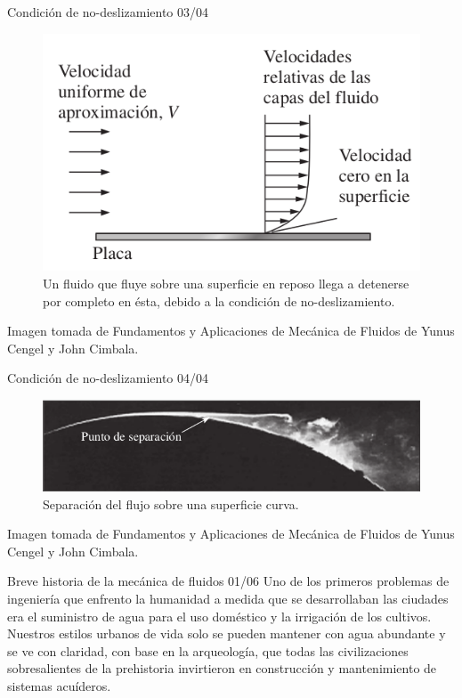 \begin{frame}{Condición de no-deslizamiento 03/04}
\justifying
\begin{figure}[H]
\centering
\includegraphics[scale=0.2]{Section_Files/imagenes/sec01_0101_Fig01-10.png}
\caption{Un fluido que fluye sobre una superficie en reposo llega a detenerse por completo en ésta, debido a la condición de no-deslizamiento.}
\label{fig: Figura1-10}
\end{figure}
Imagen tomada de Fundamentos y Aplicaciones de Mecánica de Fluidos de Yunus Cengel y John Cimbala.
\end{frame}
	
\begin{frame}{Condición de no-deslizamiento 04/04}
\justifying
\begin{figure}[H]
\centering
\includegraphics[scale=0.2]{Section_Files/imagenes/sec01_0101_Fig01-11.png}
\caption{Separación del flujo sobre una superficie curva.}
\label{fig: Figura1-11}
\end{figure}
Imagen tomada de Fundamentos y Aplicaciones de Mecánica de Fluidos de Yunus Cengel y John Cimbala.
\end{frame}




\begin{frame}{Breve historia de la mecánica de fluidos 01/06}
\justifying
Uno de los primeros problemas de ingeniería que enfrento la humanidad a medida que se desarrollaban las ciudades era el suministro de agua para el uso doméstico y la irrigación de los cultivos. Nuestros estilos urbanos de vida solo se pueden mantener con agua abundante y se ve con claridad, con base en la arqueología, que todas las civilizaciones sobresalientes de la prehistoria invirtieron en construcción y mantenimiento de sistemas acuíderos.
\end{frame}
	
